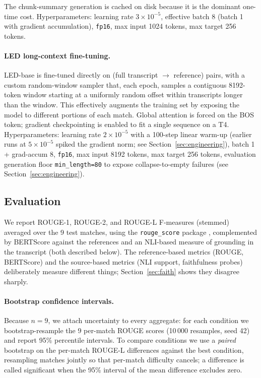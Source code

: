 \documentclass[10pt,a4paper]{article}
\begin{document}
The chunk-summary generation is cached on disk because it is the dominant one-time cost. Hyperparameters: learning rate $3\!\times\!10^{-5}$, effective batch 8 (batch 1 with gradient accumulation), \texttt{fp16}, max input 1024 tokens, max target 256 tokens.

\paragraph{LED long-context fine-tuning.}
LED-base is fine-tuned directly on (full transcript $\to$ reference) pairs, with a custom random-window sampler that, each epoch, samples a contiguous 8192-token window starting at a uniformly random offset within transcripts longer than the window. This effectively augments the training set by exposing the model to different portions of each match. Global attention is forced on the BOS token; gradient checkpointing is enabled to fit a single sequence on a T4. Hyperparameters: learning rate $2\!\times\!10^{-5}$ with a 100-step linear warm-up (earlier runs at $5\!\times\!10^{-5}$ spiked the gradient norm; see Section~\ref{sec:engineering}), batch 1 + grad-accum 8, \texttt{fp16}, max input 8192 tokens, max target 256 tokens, evaluation generation floor \texttt{min\_length=80} to expose collapse-to-empty failures (see Section~\ref{sec:engineering}).

\subsection{Evaluation}
We report ROUGE-1, ROUGE-2, and ROUGE-L F-measures (stemmed) averaged over the 9 test matches, using the \texttt{rouge\_score} package \citep{lin2004rouge}, complemented by BERTScore against the references and an NLI-based measure of grounding in the transcript (both described below). The reference-based metrics (ROUGE, BERTScore) and the source-based metrics (NLI support, faithfulness probes) deliberately measure different things; Section~\ref{sec:faith} shows they disagree sharply.

\paragraph{Bootstrap confidence intervals.}
Because $n=9$, we attach uncertainty to every aggregate: for each condition we bootstrap-resample the 9 per-match ROUGE scores (10\,000 resamples, seed 42) and report 95\% percentile intervals. To compare conditions we use a \emph{paired} bootstrap on the per-match ROUGE-L differences against the best condition, resampling matches jointly so that per-match difficulty cancels; a difference is called significant when the 95\% interval of the mean difference excludes zero.
\end{document}
